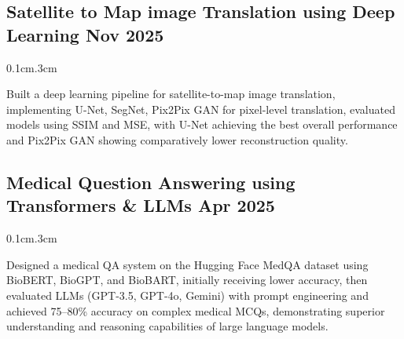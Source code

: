 \subsection{{ Satellite to Map image Translation using Deep Learning  \hfill Nov 2025}}
\begin{adjustwidth}{0.1cm}{.3cm}
\begin{zitemize}
\item \begin{justify}Built a deep learning pipeline for satellite-to-map image translation, implementing U-Net, SegNet, Pix2Pix GAN for pixel-level translation, evaluated models using SSIM and MSE, with U-Net achieving the best overall performance and Pix2Pix GAN showing comparatively lower reconstruction quality.

\end{justify}
\end{zitemize}
\end{adjustwidth}
\vspace{.70em}




\subsection{{ Medical Question Answering using Transformers \& LLMs \hfill Apr 2025}}
\begin{adjustwidth}{0.1cm}{.3cm}
\begin{zitemize}
\item \begin{justify}Designed a medical QA system on the Hugging Face MedQA dataset using BioBERT, BioGPT, and BioBART, initially receiving lower accuracy, then evaluated LLMs (GPT-3.5, GPT-4o, Gemini) with prompt engineering and achieved 75–80\% accuracy on complex medical MCQs, demonstrating superior understanding and reasoning capabilities of large language models.\end{justify}
\end{zitemize}
\end{adjustwidth}
\vspace{.70em}
